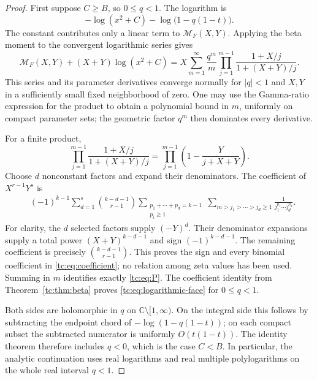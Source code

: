 \documentclass[11pt,a4paper]{article}
\numberwithin{equation}{section}
\theoremstyle{definition}
\theoremstyle{remark}
\begin{document}
\begin{proof}
First suppose $C\ge B$, so $0\le q<1$.  The logarithm is
\[
 -\log(x^2+C)-\log\bigl(1-q(1-t)\bigr).
\]
The constant contributes only a linear term to
$\mathcal M_F(X,Y)$.  Applying the beta moment to the convergent
logarithmic series gives
\begin{equation}\label{tc:eq:log-generating-function}
 \mathcal M_F(X,Y)+(X+Y)\log(x^2+C)
   =X\sum_{m=1}^{\infty}\frac{q^m}{m}
            \prod_{j=1}^{m-1}\frac{1+X/j}{1+(X+Y)/j}.
\end{equation}
This series and its parameter derivatives converge normally for
$|q|<1$ and $X,Y$ in a sufficiently small fixed neighborhood of
zero.  One may use the Gamma-ratio expression for the product to
obtain a polynomial bound in $m$, uniformly on compact parameter
sets; the geometric factor $q^m$ then dominates every derivative.

For a finite product,
\[
 \prod_{j=1}^{m-1}\frac{1+X/j}{1+(X+Y)/j}
   =\prod_{j=1}^{m-1}\left(1-\frac{Y}{j+X+Y}\right).
\]
Choose $d$ nonconstant factors and expand their denominators.
The coefficient of $X^{r-1}Y^s$ is
\begin{align}
 &(-1)^{k-1}\sum_{d=1}^{s}\binom{k-d-1}{r-1}
  \sum_{\substack{p_1+\cdots+p_d=k-1\\p_i\ge1}}
  \sum_{m>j_1>\cdots>j_d\ge1}
                \frac{1}{j_1^{p_1}\cdots j_d^{p_d}}.
                                                     \label{tc:eq:coefficient}
\end{align}
For clarity, the $d$ selected factors supply $(-Y)^d$.
Their denominator expansions supply a total power
$(X+Y)^{k-d-1}$ and sign $(-1)^{k-d-1}$.
The remaining coefficient is precisely
$\binom{k-d-1}{r-1}$.  This proves the sign and every binomial
coefficient in \eqref{tc:eq:coefficient}; no relation among zeta
values has been used.  Summing in $m$ identifies exactly
\eqref{tc:eq:P}.  The coefficient identity from
Theorem~\ref{tc:thm:beta} proves
\eqref{tc:eq:logarithmic-face} for $0\le q<1$.

Both sides are holomorphic in $q$ on
$\mathbb C\setminus[1,\infty)$.  On the integral side this follows
by subtracting the endpoint chord of $-\log(1-q(1-t))$;
on each compact subset the subtracted numerator is uniformly
$O(t(1-t))$.  The identity theorem therefore includes $q<0$,
which is the case $C<B$.  In particular, the analytic continuation
uses real logarithms and real multiple polylogarithms on the whole
real interval $q<1$.
\end{proof}
\end{document}
